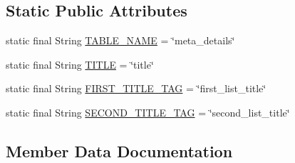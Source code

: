 \subsection*{Static Public Attributes}
\begin{DoxyCompactItemize}
\item 
static final String \hyperlink{classorg_1_1buildmlearn_1_1matchtemplate_1_1data_1_1MatchContract_1_1MetaDetails_a5aacda813308d069f9225434274cdf83}{T\+A\+B\+L\+E\+\_\+\+N\+A\+ME} = \char`\"{}meta\+\_\+details\char`\"{}
\item 
static final String \hyperlink{classorg_1_1buildmlearn_1_1matchtemplate_1_1data_1_1MatchContract_1_1MetaDetails_a7700c6e3701a1af4f64803ddaa60231c}{T\+I\+T\+LE} = \char`\"{}title\char`\"{}
\item 
static final String \hyperlink{classorg_1_1buildmlearn_1_1matchtemplate_1_1data_1_1MatchContract_1_1MetaDetails_a9b39b19274d18aed339f76b44280c6c8}{F\+I\+R\+S\+T\+\_\+\+T\+I\+T\+L\+E\+\_\+\+T\+AG} = \char`\"{}first\+\_\+list\+\_\+title\char`\"{}
\item 
static final String \hyperlink{classorg_1_1buildmlearn_1_1matchtemplate_1_1data_1_1MatchContract_1_1MetaDetails_a3011fd7c22ff84e243ecd5264ffba5c6}{S\+E\+C\+O\+N\+D\+\_\+\+T\+I\+T\+L\+E\+\_\+\+T\+AG} = \char`\"{}second\+\_\+list\+\_\+title\char`\"{}
\end{DoxyCompactItemize}


\subsection{Member Data Documentation}
